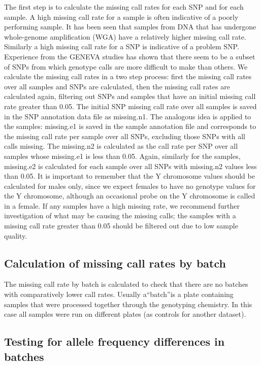 \documentclass[]{book}
\theoremstyle{definition}
\theoremstyle{definition}
\theoremstyle{definition}
\theoremstyle{remark}
\begin{document}
The ﬁrst step is to calculate the missing call rates for each SNP and
for each sample. A high missing call rate for a sample is often
indicative of a poorly performing sample. It has been seen that samples
from DNA that has undergone whole-genome ampliﬁcation (WGA) have a
relatively higher missing call rate. Similarly a high missing call rate
for a SNP is indicative of a problem SNP. Experience from the GENEVA
studies has shown that there seem to be a subset of SNPs from which
genotype calls are more diﬃcult to make than others. We calculate the
missing call rates in a two step process: ﬁrst the missing call rates
over all samples and SNPs are calculated, then the missing call rates
are calculated again, ﬁltering out SNPs and samples that have an initial
missing call rate greater than 0.05. The initial SNP missing call rate
over all samples is saved in the SNP annotation data ﬁle as missing.n1.
The analogous idea is applied to the samples: missing.e1 is saved in the
sample annotation ﬁle and corresponds to the missing call rate per
sample over all SNPs, excluding those SNPs with all calls missing. The
missing.n2 is calculated as the call rate per SNP over all samples whose
missing.e1 is less than 0.05. Again, similarly for the samples,
missing.e2 is calculated for each sample over all SNPs with missing.n2
values less than 0.05. It is important to remember that the Y chromosome
values should be calculated for males only, since we expect females to
have no genotype values for the Y chromosome, although an occasional
probe on the Y chromosome is called in a female. If any samples have a
high missing rate, we recommend further investigation of what may be
causing the missing calls; the samples with a missing call rate greater
than 0.05 should be ﬁltered out due to low sample quality.

\subsection{Calculation of missing call rates by
batch}\label{calculation-of-missing-call-rates-by-batch}

The missing call rate by batch is calculated to check that there are no
batches with comparatively lower call rates. Usually a``batch''is a
plate containing samples that were processed together through the
genotyping chemistry. In this case all samples were run on diﬀerent
plates (as controls for another dataset).

\subsection{Testing for allele frequency differences in
batches}\label{testing-for-allele-frequency-differences-in-batches}
\end{document}
